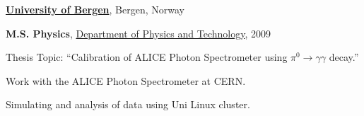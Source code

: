 \documentclass[11pt]{article}
\renewcommand{\section}[2]%
        {\pagebreak[2]\vspace{1.3\baselineskip}%
         \phantomsection\addcontentsline{toc}{section}{#1}%
         \hspace{0in}%
         \marginpar{
         \raggedright \scshape #1}#2}
\newenvironment{outerlist}[1][\enskip\textbullet]%
        {\begin{itemize}[#1]}{\end{itemize}%
         \vspace{-.6\baselineskip}}
\newenvironment{innerlist}[1][\enskip\textbullet]%
        {\begin{compactitem}[#1]}{\end{compactitem}}
\newcommand{\blankline}{\quad\pagebreak[2]}
\begin{document}
\href{http://www.uib.no/en}{\textbf{University of Bergen}},
Bergen, Norway
\begin{outerlist}

\item[] \textbf{M.S. Physics},
  \href{http://www.uib.no/ift/en}
       {Department of Physics and Technology}, 2009
        \begin{innerlist}
          \footnotesize
        \item Thesis Topic: ``Calibration of ALICE Photon Spectrometer
          using $\pi^0\rightarrow\gamma\gamma$ decay.''
        \item Work with the ALICE Photon Spectrometer at CERN.
        \item Simulating and analysis of data using Uni Linux cluster.  
        \end{innerlist}


\end{outerlist}








\end{document}

